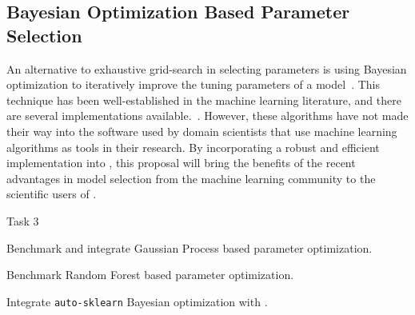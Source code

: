 \subsection{Bayesian Optimization Based Parameter Selection}
An alternative to exhaustive grid-search in selecting parameters is using
Bayesian optimization to iteratively improve the tuning parameters of a
model~\autocite{NIPS2011_4443, shahriari2016taking, NIPS2012_4522}.  This
technique has been well-established in the machine learning literature, and
there are several implementations available.~\autocite{bergstra2013hyperopt,
feurer-nips2015, komer2014hyperopt, snoek2015scalable}.  However, these
algorithms have not made their way into the software used by domain scientists
that use machine learning algorithms as tools in their research.
By incorporating a robust and efficient implementation into \sklearn{},
this proposal will bring the benefits of the recent advantages in model selection
from the machine learning community to the scientific users of \sklearn{}.
\begin{labeling}{Task 3}
    \item [Task 3] Benchmark and integrate Gaussian Process based parameter optimization.
    \item [Task 4] Benchmark Random Forest based parameter optimization.
    \item [Task 5] Integrate \texttt{auto-sklearn} Bayesian optimization with \sklearn{}.
\end{labeling}

